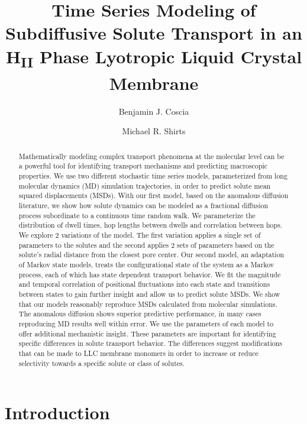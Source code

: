 \documentclass{article}
\title{Time Series Modeling of Subdiffusive Solute Transport in an H\textsubscript{II} Phase Lyotropic Liquid Crystal Membrane}
\author{Benjamin J. Coscia \and Michael R. Shirts}
\begin{document}
  \graphicspath{{./figures/}}
  \maketitle
  
  \begin{abstract}
  Mathematically modeling complex transport phenomena at the molecular level 
  can be a powerful tool for identifying transport mechanisms and predicting
  macroscopic properties. We use two different stochastic time series models,
  parameterized from long molecular dynamics (MD) simulation trajectories, in order
  to predict solute mean squared displacements (MSDs). With our first model, based
  on the anomalous diffusion literature, we show how solute dynamics can be modeled as
  a fractional diffusion process subordinate to a continuous time random walk.
  We parameterize the distribution of dwell times, hop lengths between dwells and
  correlation between hops. We explore 2 variations of the model. The first variation
  applies a single set of parameters to the solutes and the second applies 2 sets
  of parameters based on the solute's radial distance from the closest pore center.
  Our second model, an adaptation of Markov state models, treats the 
  configurational state of the system as a Markov process, each of which has state dependent transport behavior.
  We 
  fit
  the magnitude and temporal correlation
  of positional fluctuations into each state and transitions between states to gain
  further insight and allow us to predict solute MSDs. We show that our models 
  reasonably reproduce MSDs calculated from molecular simulations. The anomalous 
  diffusion shows superior predictive performance, in many cases 
  reproducing
  MD results
  well 
  within error. 
  We use the parameters of each model to offer additional mechanistic
  insight. These parameters are important for identifying specific differences in 
  solute transport behavior. The differences suggest modifications that can be
  made to LLC membrane monomers in order to increase or reduce selectivity towards a 
  specific solute
  or class of solutes.
  \end{abstract}

  \section{Introduction}
\end{document}
